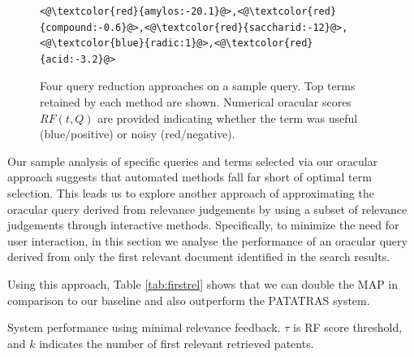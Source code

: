 \begin{figure}[t!]
\begin{framed}
\begin{lstlisting}[basicstyle=\scriptsize\ttfamily , linewidth=\columnwidth,breaklines=true]
<@\textcolor{red}{amylos:-20.1}@>,<@\textcolor{red}{compound:-0.6}@>,<@\textcolor{red}{saccharid:-12}@>,<@\textcolor{blue}{radic:1}@>,<@\textcolor{red}{acid:-3.2}@> 
 \end{lstlisting} 
 \vspace*{-2ex}
\end{framed}
 \vspace*{-2ex}
  \caption{Four query reduction approaches on a sample query.  Top
    terms retained by each method are shown.  Numerical oracular
    scores $\mathit{RF}(t,Q)$ are provided indicating whether the term
    was useful (blue/positive) or noisy (red/negative).}
  \label{fig:anecdotal}  
\end{figure}

Our sample analysis of specific queries and terms selected via our oracular
approach suggests that automated methods fall far short of optimal term selection.
This leads us to explore another approach of approximating the oracular query
derived from relevance judgements by using a subset of relevance judgements
through interactive methods.  Specifically, to minimize the need for user interaction,
in this section we analyse the performance of an oracular query derived from
only the first relevant document identified in the search results.

Using this approach, Table \ref{tab:firstrel} shows that we can double the MAP in comparison to our baseline and also outperform the PATATRAS system.

\begin{table}[t!]
  \begin{center}
   \caption{System performance using minimal relevance feedback. $\tau$ is RF score threshold, and $k$ indicates the number of first relevant retrieved patents.}\vspace{3mm}
     
  \label{tab:firstrel}
  \end{center}  
\end{table}

